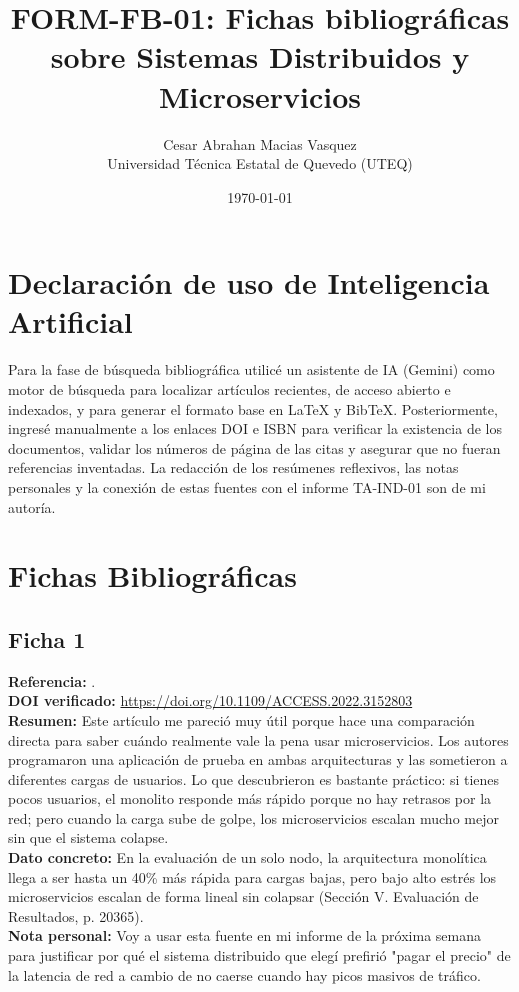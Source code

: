 \documentclass[12pt,a4paper]{article}
\title{FORM-FB-01: Fichas bibliográficas sobre Sistemas Distribuidos y Microservicios}
\author{Cesar Abrahan Macias Vasquez \\ Universidad Técnica Estatal de Quevedo (UTEQ)}
\date{\today}
\begin{document}
\maketitle

\section*{Declaración de uso de Inteligencia Artificial}
Para la fase de búsqueda bibliográfica utilicé un asistente de IA (Gemini) como motor de búsqueda para localizar artículos recientes, de acceso abierto e indexados, y para generar el formato base en LaTeX y BibTeX. Posteriormente, ingresé manualmente a los enlaces DOI e ISBN para verificar la existencia de los documentos, validar los números de página de las citas y asegurar que no fueran referencias inventadas. La redacción de los resúmenes reflexivos, las notas personales y la conexión de estas fuentes con el informe TA-IND-01 son de mi autoría.

\section*{Fichas Bibliográficas}

\subsection*{Ficha 1}
\textbf{Referencia:} . \\
\textbf{DOI verificado:} \url{https://doi.org/10.1109/ACCESS.2022.3152803} \\
\textbf{Resumen:} Este artículo me pareció muy útil porque hace una comparación directa para saber cuándo realmente vale la pena usar microservicios. Los autores programaron una aplicación de prueba en ambas arquitecturas y las sometieron a diferentes cargas de usuarios. Lo que descubrieron es bastante práctico: si tienes pocos usuarios, el monolito responde más rápido porque no hay retrasos por la red; pero cuando la carga sube de golpe, los microservicios escalan mucho mejor sin que el sistema colapse. \\
\textbf{Dato concreto:} En la evaluación de un solo nodo, la arquitectura monolítica llega a ser hasta un 40\% más rápida para cargas bajas, pero bajo alto estrés los microservicios escalan de forma lineal sin colapsar (Sección V. Evaluación de Resultados, p. 20365). \\
\textbf{Nota personal:} Voy a usar esta fuente en mi informe de la próxima semana para justificar por qué el sistema distribuido que elegí prefirió "pagar el precio" de la latencia de red a cambio de no caerse cuando hay picos masivos de tráfico.
\end{document}

